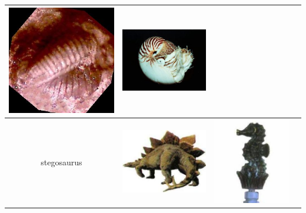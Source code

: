 \documentclass{article}
\begin{document}
\begin{table}[Ht]
\begin{tabular}{| c | c | c | c |}
\vspace{0cm}\includegraphics[scale=.15]{"Figures/False Matches/class_4_most_sure_wrong"} &
\vspace{0cm}\includegraphics[scale=.15]{"Figures/False Matches/class_4_least_sure_wrong"} \\
\hline
stegosaurus &
\vspace{0cm}\includegraphics[scale=.15]{"Figures/Best Matches/bestmatch_c5"} &
\vspace{0cm}\includegraphics[scale=.15]{"Figures/False Matches/class_5_most_sure_wrong"} &

\end{tabular}
\end{table}
\end{document}
